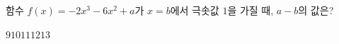 함수 $f(x)=-2x^3-6x^2+a$가 $x=b$에서 극솟값 $1$을 가질 때, $a-b$의 값은? 
\begin{choices32}{$9$}{$10$}{$11$}{$12$}{$13$}\end{choices32}
